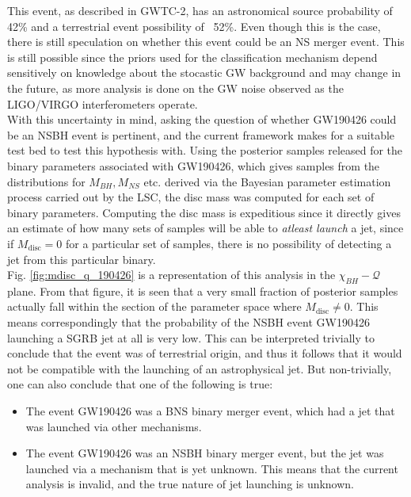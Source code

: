         This event, as described in GWTC-2, has an astronomical source probability of
        42\% and a terrestrial event possibility of ~52\%. Even though this is the case,
        there is still speculation on whether this event could be an NS merger event.
        This is still possible since the priors used for the classification mechanism
        depend sensitively on  knowledge about the stocastic GW background and may
        change in the future, as more analysis is done on the GW noise observed as the
        LIGO/VIRGO interferometers operate.\\
        With this uncertainty in mind, asking the question of whether GW190426 could be
        an NSBH event is pertinent, and the current framework makes for a suitable test
        bed to test this hypothesis with.  Using the posterior samples released for the
        binary parameters associated with GW190426, which gives samples from the
        distributions for $M_{BH}, M_{NS}$ etc.  derived via the Bayesian parameter
        estimation process carried out by the LSC, the disc mass was computed for each
        set of binary parameters. Computing the disc mass is expeditious since it
        directly gives an estimate of how many sets of samples will be able to
        \textit{atleast launch} a jet, since if $M_{\mathrm{disc}} = 0$ for a particular
        set of samples, there is no possibility of detecting a jet from this particular
        binary.\\
        Fig. \ref{fig:mdisc_q_190426} is a representation of this analysis in the
        $\chi_{BH}-\mathcal{Q}$ plane. From that figure, it is seen that a very small
        fraction of posterior samples actually fall within the section of the parameter
        space where $M_{\mathrm{disc}} \neq 0$. This means correspondingly that the
        probability of the NSBH event GW190426 launching a SGRB jet at all is very low.
        This can be interpreted trivially to conclude that the event was of terrestrial
        origin, and thus it follows that it would not be compatible with the launching
        of an astrophysical jet. But non-trivially, one can also conclude that one of
        the following is true:

        \begin{itemize}

            \item The event GW190426 was a BNS binary merger event, which had a jet that
                was launched via other mechanisms.

            \item The event GW190426 was an NSBH binary merger event, but the jet was
                launched via a mechanism that is yet unknown. This means that the
                current analysis is invalid, and the true nature of jet launching is
                unknown.

        \end{itemize}

